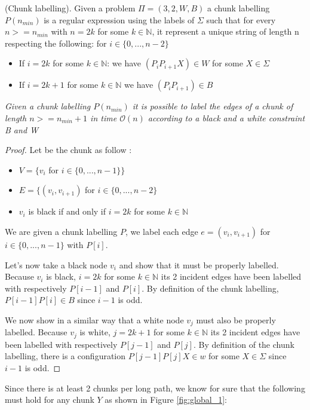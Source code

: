 \begin{itemize}
\begin{defi}
    (Chunk labelling). Given a problem $\Pi=(3,2,W,B)$ a chunk labelling $P(n_{min})$ is a regular expression using the labels of $\Sigma$ such that for every $n>=n_{min}$ with $n=2k$ for some $k\in\mathbb{N}$, it represent a unique string of length n respecting the following: for $i\in\{0,...,n-2\}$
    \begin{itemize}
        \item If $i=2k$ for some $k\in\mathbb{N}$: we have $(P_{i}P_{i+1}X)\in W$ for some $X\in \Sigma$
        \item If $i=2k+1$ for some $k\in\mathbb{N}$ we have $(P_{i}P_{i+1})\in B$
    \end{itemize}
    \end{defi}
\begin{claim}
\textit{Given a chunk labelling $P(n_{min})$ it is possible to label the edges of a chunk of length $n>=n_{min}+1$ in time $\mathcal{O}(n)$ according to a black and a white constraint B and W}
\begin{proof}
Let be the chunk as follow :
\begin{itemize}
    \item $V=\{v_i$ for $i\in\{0,...,n-1\}\}$
    \item $E=\{(v_i,v_{i+1})$ for $i\in\{0,...,n-2\}$
    \item $v_i$ is black if and only if $i=2k$ for some $k\in\mathbb{N}$ 
\end{itemize}
We are given a chunk labelling $P$, we label each edge $e = (v_i,v_{i+1})$ for $i\in\{0,...,n-1\}$ with $P[i]$.

Let's now take a black node $v_i$ and show that it must be properly labelled. Because $v_i$ is black, $i=2k$ for some $k\in\mathbb{N}$ its 2 incident edges have been labelled with respectively $P[i-1]$ and $P[i]$. By definition of the chunk labelling, $P[i-1]P[i]\in B$ since $i-1$ is odd.

We now show in a similar way that a white node $v_j$ must also be properly labelled. Because $v_j$ is white, $j=2k+1$ for some $k\in\mathbb{N}$ its 2 incident edges have been labelled with respectively $P[j-1]$ and $P[j]$. By definition of the chunk labelling, there is a configuration $P[j-1]P[j]X\in w$ for some $X\in \Sigma$ since $i-1$ is odd.
\end{proof}
\end{claim}
\end{itemize}
Since there is at least 2 chunks per long path, we know for sure that the following must hold for any chunk $Y$ as shown in Figure \ref{fig:global_1}:
